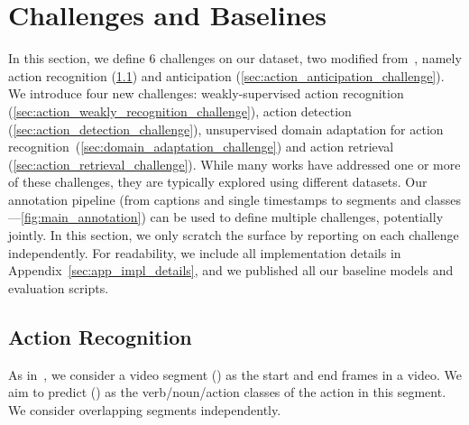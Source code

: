 \RequirePackage{amsmath} \documentclass[runningheads]{llncs}
\newcommand{\chParagraph}[1]{\noindent {\textbf{#1.}} \hspace{6pt}}
\begin{document}
\section{Challenges and Baselines}
\label{sec:challenges}
In this section, we define 6 challenges on our dataset, two modified from~\cite{Damen2018EPICKITCHENS}, namely action recognition (\cref{sec:action_recognition_challenge}) and anticipation (\cref{sec:action_anticipation_challenge}). We introduce four new challenges: weakly-supervised action recognition (\cref{sec:action_weakly_recognition_challenge}), action detection (\cref{sec:action_detection_challenge}),  unsupervised domain adaptation for action recognition~(\cref{sec:domain_adaptation_challenge}) and action retrieval (\cref{sec:action_retrieval_challenge}). 
While many works have addressed one or more of these challenges, they are typically explored using different datasets. Our annotation pipeline (from captions and single timestamps to segments and classes---\cref{fig:main_annotation}) can be used to define multiple challenges, potentially jointly. In this section, we only scratch the surface by reporting on each challenge independently. For readability, we include all implementation details in Appendix~\ref{sec:app_impl_details}, and we published all our baseline models and evaluation scripts.
\subsection{Action Recognition}
\label{sec:action_recognition_challenge}
\chParagraph{Definition} As in~\cite{Damen2018EPICKITCHENS}, we consider a video segment () as the start and end frames in a video. We aim to predict () as the verb/noun/action classes of the action in this segment. We consider overlapping segments independently.
\end{document}
